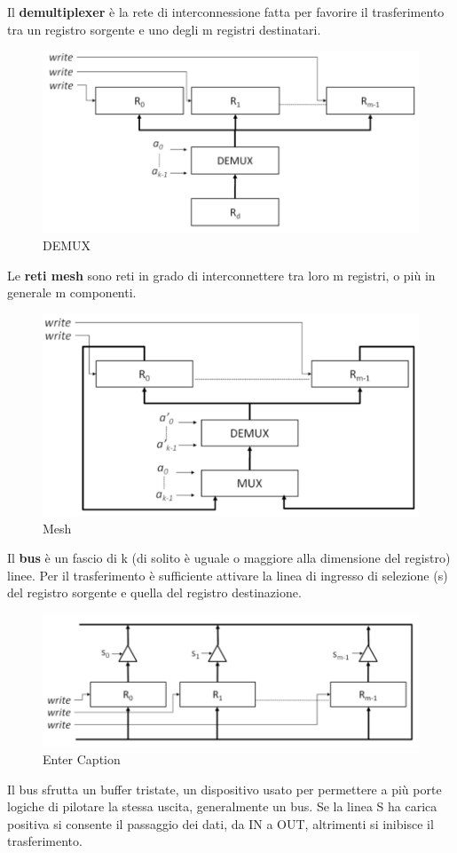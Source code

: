 \documentclass[12pt]{article}
\begin{document}
\newpage 
\noindent Il \textbf{demultiplexer} è la rete di interconnessione fatta per favorire il trasferimento tra un registro sorgente e uno degli m registri destinatari.
\begin{figure}[h]
    \centering
    \includegraphics[width=0.5\linewidth]{demux.png}
    \caption{DEMUX}
    \label{fig:enter-label}
\end{figure}
\par\medskip\noindent
Le \textbf{reti mesh} sono reti in grado di interconnettere tra loro m registri, o più in generale m componenti.
\begin{figure}[h]
    \centering
    \includegraphics[width=0.5\linewidth]{mesh.png}
    \caption{Mesh}
    \label{fig:enter-label}
\end{figure}
\par\medskip\noindent
Il \textbf{bus} è un fascio di k (di solito è uguale o maggiore alla dimensione del
registro) linee. Per il trasferimento è sufficiente attivare la linea di ingresso di selezione (s)
del registro sorgente e quella del registro destinazione.\par\medskip\noindent 
\begin{figure}[h]
    \centering
    \includegraphics[width=0.5\linewidth]{bus.png}
    \caption{Enter Caption}
    \label{fig:enter-label}
\end{figure}
\newpage 
\noindent Il bus sfrutta un buffer tristate, un dispositivo usato per permettere a più porte
logiche di pilotare la stessa uscita, generalmente un bus. Se la linea S ha carica positiva
si consente il passaggio dei dati, da IN a OUT, altrimenti si inibisce il trasferimento.\par\medskip\noindent
\end{document}
